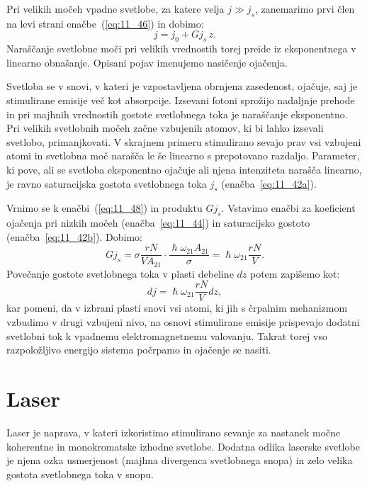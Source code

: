 Pri velikih močeh vpadne svetlobe, za katere velja $j \gg j_s$, 
zanemarimo prvi člen na levi strani enačbe~(\ref{eq:11_46}) in dobimo:
\begin{equation}
j = j_0 + Gj_s\, z.
\label{eq:11_48}
\end{equation}
Naraščanje svetlobne moči pri velikih vrednostih torej preide iz 
eksponentnega v linearno obnašanje. Opisani pojav imenujemo 
nasičenje ojačenja.

Svetloba se v snovi, v kateri je vzpostavljena
obrnjena zasedenost, ojačuje, saj je stimulirane emisije več
kot absorpcije. Izsevani fotoni sprožijo nadaljnje prehode
in pri majhnih vrednostih gostote svetlobnega toka je  
naraščanje eksponentno. Pri velikih svetlobnih močeh začne
vzbujenih atomov, ki bi lahko izsevali svetlobo, primanjkovati.
V skrajnem primeru stimulirano sevajo prav vsi vzbujeni atomi in 
svetlobna moč narašča le še linearno s prepotovano razdaljo. 
Parameter, ki pove, 
ali se svetloba eksponentno ojačuje ali njena
intenziteta narašča linearno, je ravno saturacijska
gostota svetlobnega toka $j_s$ (enačba~\ref{eq:11_42a}). 

Vrnimo se k enačbi~(\ref{eq:11_48}) in produktu $Gj_s$. Vstavimo enačbi
za koeficient ojačenja pri nizkih močeh (enačba~\ref{eq:11_44}) 
in saturacijsko gostoto (enačba~\ref{eq:11_42b}). Dobimo:
\begin{equation}
Gj_s = \sigma \frac{r N}{V A_{21}} 
\cdot \frac{\hslash \omega_{21} A_{21}}{\sigma}=
\hslash \omega_{21}\frac{rN}{V}.
\label{eq:11_49}
\end{equation}
Povečanje gostote svetlobnega toka v plasti debeline $dz$ potem zapišemo kot:
\begin{equation}
dj = \hslash \omega_{21}\frac{rN}{V}dz,
\label{eq:11_50}
\end{equation}
kar pomeni, da v izbrani plasti snovi vsi atomi, 
ki jih s črpalnim mehanizmom vzbudimo v drugi vzbujeni
nivo, na osnovi stimulirane emisije prispevajo dodatni 
svetlobni tok k vpadnemu elektromagnetnemu valovanju.
Takrat torej vso razpoložljivo energijo sistema počrpamo 
in ojačenje se nasiti. 

\section{Laser}
Laser je naprava, v kateri izkoristimo stimulirano sevanje 
za nastanek močne koherentne in monokromatske izhodne svetlobe. Dodatna odlika
laserske svetlobe je njena ozka usmerjenost (majhna divergenca svetlobnega snopa)
in zelo velika gostota svetlobnega toka v snopu.

